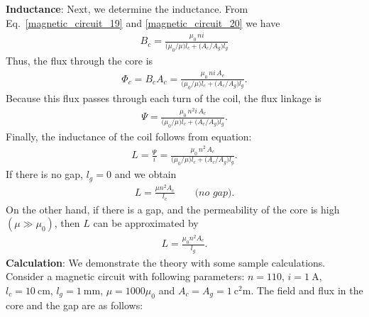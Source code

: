 \documentclass[12pt,a4paper,oneside]{book}
\begin{document}
\begin{onehalfspace}
\begin{example}
\textbf{Inductance}: Next, we determine the inductance. From Eq.~\eqref{magnetic_circuit_19} and \ref{magnetic_circuit_20} we have
	\begin{equation}\label{magnetic_circuit_23}
	{\begin{aligned}
			B_c=\frac{\mu_0\,ni}{\Big(\mu_0/\mu\Big)l_c+\Big(A_c/A_g\Big)l_g}
	\end{aligned}}
	\end{equation}
Thus, the flux through the core is 
	\begin{equation}\label{magnetic_circuit_24}
	{\begin{aligned}
			\Phi_c=B_cA_c=\frac{\mu_0\,ni\,A_c}{\Big(\mu_0/\mu\Big)l_c+\Big(A_c/A_g\Big)l_g}.
	\end{aligned}}
\end{equation}
Because this flux passes through each turn of the coil, the flux linkage is
	\begin{equation}\label{magnetic_circuit_25}
	{\begin{aligned}
			\Psi=\frac{\mu_0\,n^2i\,A_c}{\Big(\mu_0/\mu\Big)l_c+\Big(A_c/A_g\Big)l_g}.
	\end{aligned}}
	\end{equation}
Finally, the inductance of the coil follows from equation:
	\begin{equation}\label{magnetic_circuit_26}
	{\begin{aligned}
			L=\frac{\Psi}{i}=\frac{\mu_0\,n^2\,A_c}{\Big(\mu_0/\mu\Big)l_c+\Big(A_c/A_g\Big)l_g}.
	\end{aligned}}
	\end{equation}
If there is no gap, $l_g=0$ and we obtain
	\begin{equation}\label{magnetic_circuit_27}
	{\begin{aligned}
			L=\frac{\mu n^2 A_c}{l_c}\qquad\textit{(no gap).}
	\end{aligned}}
	\end{equation}
On the other hand, if there is a gap, and the permeability of the core is high $(\mu\gg\mu_0)$, then $L$ can be approximated by
	\begin{equation}\label{magnetic_circuit_28}
	{\begin{aligned}
			L=\frac{\mu_0 n^2 A_c}{l_g}.
	\end{aligned}}
	\end{equation}
\textbf{Calculation}: We demonstrate the theory with some sample calculations. Consider a magnetic circuit with following parameters: $n=110$, $i=\SI{1}{\ampere}$, $l_c=\SI{10}{\centi\meter}$, $l_g=\SI{1}{\milli\meter}$, $\mu=1000\mu_0$ and $A_c=A_g=\SI{1}{\square\centi\meter}$. The field and flux in the core and the gap are as follows:

\end{example}
\end{onehalfspace}
\end{document}
